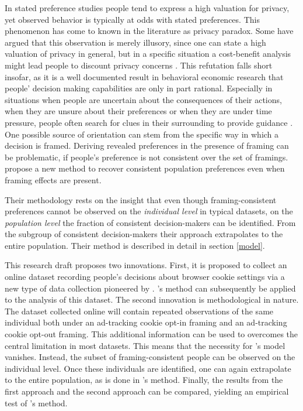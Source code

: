 

In stated preference studies people tend to express a high valuation for privacy, yet observed behavior is typically at odds with stated preferences.
This phenomenon has come to known in the literature as privacy paradox. Some have argued that this observation is 
merely illusory, since one can state a high valuation of privacy in general, but in a specific situation a cost-benefit analysis might 
lead people to discount privacy concerns \parencite[p. 2]{acquisti2015privacy}. This refutation falls short insofar, as it is a well documented result in behavioral economic research that people'
decision making capabilities are only in part rational. Especially in situations when people are uncertain about the consequences of their actions, when they are unsure about their preferences or when they 
are under time pressure, people often search for clues in their surrounding to provide guidance \parencite[p. 3]{acquisti2015privacy}. One possible source of 
orientation can stem from the specific way in which a decision is framed. Deriving revealed preferences in the presence of framing can be problematic, if people's preference 
is not consistent over the set of framings. \textcite{goldin2020} propose a new method to recover consistent population preferences even when framing effects are present. 

Their methodology rests on the insight that even though framing-consistent preferences cannot be observed on the \textit{individual level} in typical datasets, 
on the \textit{population level} the fraction of consistent decision-makers can be identified. From the subgroup of consistent decision-makers their approach
extrapolates to the entire population. Their method is described in detail in section \ref{model}.

This research draft proposes two innovations. First, it is proposed to collect an online dataset recording people's decisions about browser cookie settings via a new type of data collection
pioneered by \textcite{levy2020}. \textcite{goldin2020}'s method can subsequently be applied to the analysis of this dataset. The second innovation is methodological in nature.
The dataset collected online will contain repeated observations of the same individual both under an ad-tracking cookie opt-in framing and an ad-tracking cookie opt-out framing. 
This additional information can be used to overcomes the central limitation in most datasets. This means that the necessity for \textcite{goldin2020}'s model vanishes. 
Instead, the subset of framing-consistent people can be observed on the individual level. Once these individuals are identified, one can again extrapolate to the entire population, as
is done in \textcite{goldin2020}'s method. Finally, the results from the first approach and the second approach can be compared, yielding an empirical test of 
\textcite{goldin2020}'s method.

